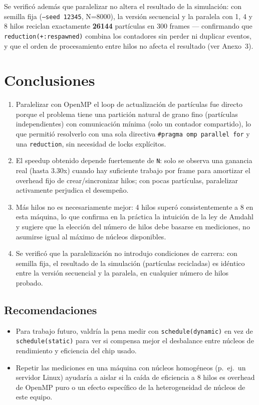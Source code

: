 \documentclass[12pt,letterpaper]{article}
\begin{document}
Se verificó además que paralelizar no altera el resultado de la
simulación: con semilla fija (\texttt{--seed 12345}, N=8000), la
versión secuencial y la paralela con 1, 4 y 8 hilos reciclan exactamente
\textbf{26144} partículas en 300 frames --- confirmando que
\texttt{reduction(+:respawned)} combina los contadores sin perder ni
duplicar eventos, y que el orden de procesamiento entre hilos no afecta
el resultado (ver Anexo~3).

\section{Conclusiones}

\begin{enumerate}
\item Paralelizar con OpenMP el loop de actualización de partículas fue
directo porque el problema tiene una partición natural de grano fino
(partículas independientes) con comunicación mínima (solo un contador
compartido), lo que permitió resolverlo con una sola directiva
\texttt{\#pragma omp parallel for} y una \texttt{reduction}, sin
necesidad de locks explícitos.
\item El speedup obtenido depende fuertemente de \texttt{N}: solo se
observa una ganancia real (hasta 3.30x) cuando hay suficiente trabajo por
frame para amortizar el overhead fijo de crear/sincronizar hilos; con
pocas partículas, paralelizar activamente perjudica el desempeño.
\item Más hilos no es necesariamente mejor: 4 hilos superó consistentemente
a 8 en esta máquina, lo que confirma en la práctica la intuición de la
ley de Amdahl y sugiere que la elección del número de hilos debe basarse
en mediciones, no asumirse igual al máximo de núcleos disponibles.
\item Se verificó que la paralelización no introdujo condiciones de
carrera: con semilla fija, el resultado de la simulación (partículas
recicladas) es idéntico entre la versión secuencial y la paralela, en
cualquier número de hilos probado.
\end{enumerate}

\subsection*{Recomendaciones}

\begin{itemize}
\item Para trabajo futuro, valdría la pena medir con
\texttt{schedule(dynamic)} en vez de \texttt{schedule(static)} para ver
si compensa mejor el desbalance entre núcleos de rendimiento y
eficiencia del chip usado.
\item Repetir las mediciones en una máquina con núcleos homogéneos
(p.\ ej.\ un servidor Linux) ayudaría a aislar si la caída de eficiencia
a 8 hilos es overhead de OpenMP puro o un efecto específico de la
heterogeneidad de núcleos de este equipo.
\end{itemize}
\end{document}
